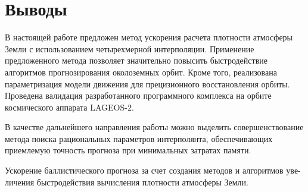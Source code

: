 \section{Выводы}
\label{sec:Chapter5} 
В настоящей работе предложен метод ускорения расчета плотности атмосферы Земли с 
использованием четырехмерной интерполяции. 
Применение предложенного метода позволяет значительно повысить
быстродействие алгоритмов прогнозирования околоземных орбит.
Кроме того, реализована параметризация модели движения для прецизионного
восстановления орбиты. Проведена валидация разработанного программного комплекса на 
орбите космического аппарата LAGEOS-2.

В качестве дальнейшего направления работы можно выделить совершенствование метода
поиска рациональных параметров интерполянта, обеспечивающих приемлемую точность прогноза
при минимальных затратах памяти.
\newpage

Ускорение баллистического прогноза за счет создания методов и алгоритмов уве-
личения быстродействия вычисления плотности атмосферы Земли.